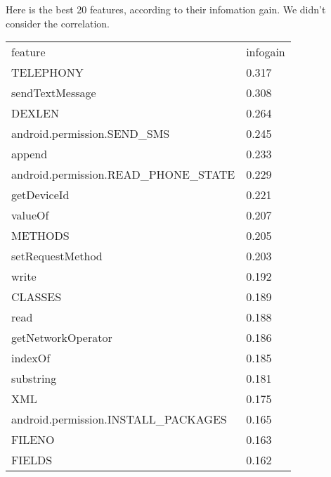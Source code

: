 Here is the best 20 features, according to their infomation gain. We didn't consider the correlation.

\begin{tabular}{l l}
 feature & infogain \\
 TELEPHONY & 0.317 \\
 sendTextMessage & 0.308 \\
 DEXLEN & 0.264 \\
 android.permission.SEND\_SMS & 0.245 \\
 append & 0.233 \\
 android.permission.READ\_PHONE\_STATE & 0.229 \\
 getDeviceId & 0.221 \\
 valueOf & 0.207 \\
 METHODS & 0.205 \\
 setRequestMethod & 0.203 \\
 write & 0.192 \\
 CLASSES & 0.189 \\
 read & 0.188 \\
 getNetworkOperator & 0.186 \\
 indexOf & 0.185 \\
 substring & 0.181 \\
 XML & 0.175 \\
 android.permission.INSTALL\_PACKAGES & 0.165 \\
 FILENO & 0.163 \\
 FIELDS & 0.162 \\
\end{tabular}

